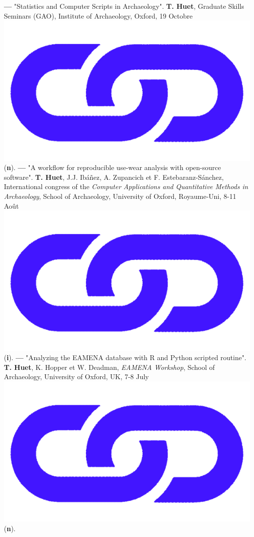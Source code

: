 \documentclass{article}
\begin{document}
\textbf{--- }"Statistics and Computer Scripts in Archaeology". \textbf{T. Huet}, Graduate Skills Seminars (GAO), Institute of Archaeology, Oxford, 19 Octobre \href{http://shinyserver.cfs.unipi.it:3838/teach/stats/gao/_site/#/title-slide}{\includegraphics[scale=0.02]{link_darkblue.png}} (\textbf{n}).
\smallbreak
\textbf{--- }"A workflow for reproducible use-wear analysis with open-source software". \textbf{T. Huet}, J.J. Ibáñez, A. Zupancich et F. Estebaranz-Sánchez, International congress of the \textit{Computer Applications and Quantitative Methods in Archaeology}, School of Archaeology, University of Oxford, Royaume-Uni, 8-11 Août \href{https://zoometh.github.io/reveal.js/projects/caa_3dlithic}{\includegraphics[scale=0.02]{link_darkblue.png}} (\textbf{i}).
\smallbreak
\textbf{--- }"Analyzing the EAMENA database with R and Python scripted routine". \textbf{T. Huet}, K. Hopper et W. Deadman, \textit{EAMENA Workshop}, School of Archaeology, University of Oxford, UK, 7-8 July \href{https://eamena-project.github.io/reveal.js/projects/time.html}{\includegraphics[scale=0.02]{link_darkblue.png}} (\textbf{n}).
\end{document}
